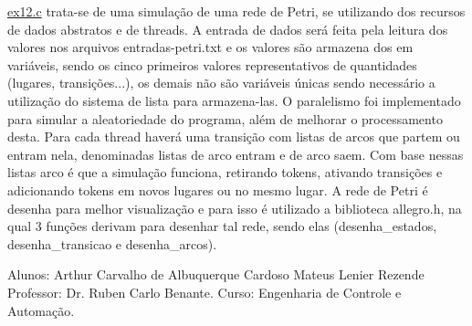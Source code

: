 \hyperlink{ex12_8c}{ex12.\+c} trata-\/se de uma simulação de uma rede de Petri, se utilizando dos recursos de dados abstratos e de threads. A entrada de dados será feita pela leitura dos valores nos arquivos entradas-\/petri.\+txt e os valores são armazena dos em variáveis, sendo os cinco primeiros valores representativos de quantidades (lugares, transições...), os demais não são variáveis únicas sendo necessário a utilização do sistema de lista para armazena-\/las. O paralelismo foi implementado para simular a aleatoriedade do programa, além de melhorar o processamento desta. Para cada thread haverá uma transição com listas de arcos que partem ou entram nela, denominadas listas de arco entram e de arco saem. Com base nessas listas arco é que a simulação funciona, retirando tokens, ativando transições e adicionando tokens em novos lugares ou no mesmo lugar. A rede de Petri é desenha para melhor visualização e para isso é utilizado a biblioteca allegro.\+h, na qual 3 funções derivam para desenhar tal rede, sendo elas (desenha\+\_\+estados, desenha\+\_\+transicao e desenha\+\_\+arcos).

\begin{DoxyVerb}Alunos: Arthur Carvalho de Albuquerque Cardoso
        Mateus Lenier Rezende
Professor: Dr. Ruben Carlo Benante.
Curso: Engenharia de Controle e Automação.\end{DoxyVerb}
 